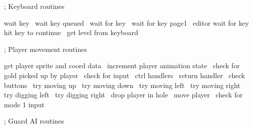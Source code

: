 \documentclass[10pt]{report}%
\begin{document}
    ; Keyboard routines

    \LA{}wait key~{\nwtagstyle{}}\RA{}
    \LA{}wait key queued~{\nwtagstyle{}}\RA{}
    \LA{}wait for key~{\nwtagstyle{}}\RA{}
    \LA{}wait for key page1~{\nwtagstyle{}}\RA{}
    \LA{}editor wait for key~{\nwtagstyle{}}\RA{}
    \LA{}hit key to continue~{\nwtagstyle{}}\RA{}
    \LA{}get level from keyboard~{\nwtagstyle{}}\RA{}

    ; Player movement routines

    \LA{}get player sprite and coord data~{\nwtagstyle{}}\RA{}
    \LA{}increment player animation state~{\nwtagstyle{}}\RA{}
    \LA{}check for gold picked up by player~{\nwtagstyle{}}\RA{}
    \LA{}check for input~{\nwtagstyle{}}\RA{}
    \LA{}ctrl handlers~{\nwtagstyle{}}\RA{}
    \LA{}return handler~{\nwtagstyle{}}\RA{}
    \LA{}check buttons~{\nwtagstyle{}}\RA{}
    \LA{}try moving up~{\nwtagstyle{}}\RA{}
    \LA{}try moving down~{\nwtagstyle{}}\RA{}
    \LA{}try moving left~{\nwtagstyle{}}\RA{}
    \LA{}try moving right~{\nwtagstyle{}}\RA{}
    \LA{}try digging left~{\nwtagstyle{}}\RA{}
    \LA{}try digging right~{\nwtagstyle{}}\RA{}
    \LA{}drop player in hole~{\nwtagstyle{}}\RA{}
    \LA{}move player~{\nwtagstyle{}}\RA{}
    \LA{}check for mode 1 input~{\nwtagstyle{}}\RA{}

    ; Guard AI routines
\end{document}
